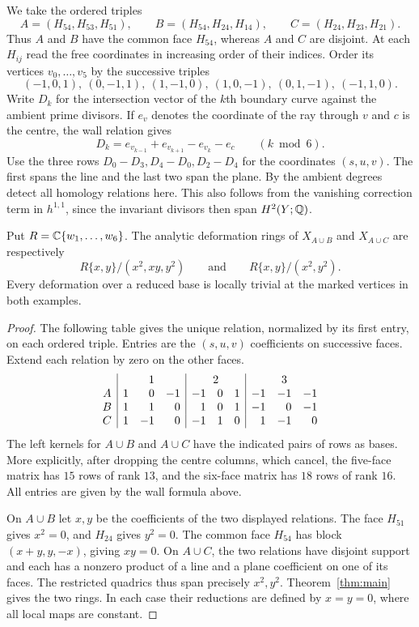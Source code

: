 We take the ordered triples
\[
 A=(H_{54},H_{53},H_{51}),\qquad
 B=(H_{54},H_{24},H_{14}),\qquad
 C=(H_{24},H_{23},H_{21}).
\]
Thus $A$ and $B$ have the common face $H_{54}$, whereas $A$ and $C$
are disjoint. At each $H_{ij}$ read the free coordinates in increasing
order of their indices. Order its vertices $v_0,\ldots,v_5$ by the
successive triples
\[
 (-1,0,1),\ (0,-1,1),\ (1,-1,0),\ (1,0,-1),\ (0,1,-1),\ (-1,1,0).
\]
Write $D_k$ for the intersection vector of the $k$th boundary curve
against the ambient prime divisors. If $e_v$ denotes the coordinate of
the ray through $v$ and $c$ is the centre, the wall relation gives
\[
 D_k=e_{v_{k-1}}+e_{v_{k+1}}-e_{v_k}-e_c
 \qquad(k\bmod 6).
\]
Use the three rows $D_0-D_3,D_4-D_0,D_2-D_4$ for the coordinates
$(s,u,v)$. The first spans the line and the last two span the plane.
By \cite[Proposition~8.3]{W4} the ambient degrees detect all homology
relations here. This also follows from the vanishing correction term in
$h^{1,1}$, since the invariant divisors then span $H^2(Y;\mathbb Q)$.

\begin{proposition}\label{prop:cube-examples}
Put $R=\mathbb C\{w_1,\ldots,w_6\}$. The analytic deformation rings of
$X_{A\cup B}$ and $X_{A\cup C}$ are respectively
\[
 R\{x,y\}/(x^2,xy,y^2)
 \qquad\text{and}\qquad
 R\{x,y\}/(x^2,y^2).
\]
Every deformation over a reduced base is locally trivial at the
marked vertices in both examples.
\end{proposition}

\begin{proof}
The following table gives the unique relation, normalized by its first
entry, on each ordered triple. Entries are the $(s,u,v)$ coefficients
on successive faces. Extend each relation by zero on the other faces.
\[
\begin{array}{c|rrr|rrr|rrr}
 &\multicolumn{3}{c|}{1}&\multicolumn{3}{c|}{2}&\multicolumn{3}{c}{3}\\
 A &1&0&-1&-1&0&1&-1&-1&-1\\
 B &1&1&0&1&0&1&-1&0&-1\\
 C &1&-1&0&-1&1&0&1&-1&0
\end{array}
\]
The left kernels for $A\cup B$ and $A\cup C$ have the indicated
pairs of rows as bases. More explicitly, after dropping the centre
columns, which cancel, the five-face matrix has $15$ rows of rank
$13$, and the six-face matrix has $18$ rows of rank $16$. All entries
are given by the wall formula above.

On $A\cup B$ let $x,y$ be the coefficients of the two displayed
relations. The face $H_{51}$ gives $x^2=0$, and $H_{24}$ gives
$y^2=0$. The common face $H_{54}$ has block $(x+y,y,-x)$, giving
$xy=0$. On $A\cup C$, the two relations have disjoint support and
each has a nonzero product of a line and a plane coefficient on one
of its faces. The restricted quadrics thus span precisely $x^2,y^2$.
Theorem~\ref{thm:main} gives the two rings. In each case their
reductions are defined by $x=y=0$, where all local maps are constant.
\end{proof}

